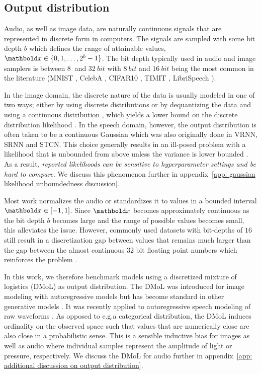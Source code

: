 {\subsection{Output distribution}
Audio, as well as image data, are naturally continuous signals that are represented in discrete form in computers. The signals are sampled with some bit depth $b$ which defines the range of attainable values, $\xb\in\{0,1,\dots,2^b-1\}$. The bit depth typically used in audio and image samplers is between $\SI{8}{}$ and $\SI{32}{bit}$ with $\SI{8}{bit}$ and $\SI{16}{bit}$ being the most common in the literature (MNIST \cite{lecun_gradientbased_1998}, CelebA \cite{liu_deep_2015}, CIFAR10 \cite{krizhevsky_learning_2009}, TIMIT \cite{garofolo_timit_1993}, LibriSpeech \cite{panayotov_librispeech_2015}).

In the image domain, the discrete nature of the data is usually modeled in one of two ways; either by using discrete distributions \cite{salimans_pixelcnn_2017, maaloe_biva_2019, child_very_2021} or by dequantizing the data and using a continuous distribution \cite{dinh_nice_2015, sonderby_ladder_2016, ho_flow_2019}, which yields a lower bound on the discrete distribution likelihood \cite{theis_note_2016}. 
In the speech domain, however, the output distribution is often taken to be a continuous Gaussian \cite{hsu_unsupervised_2017,lai_stochastic_2018,zhu_s3vae_2020} which was also originally done in VRNN, SRNN and STCN. 
This choice generally results in an ill-posed problem with a likelihood that is unbounded from above unless the variance is lower bounded \cite{mattei_leveraging_2018}. As a result, \emph{reported likelihoods can be sensitive to hyperparameter settings and be hard to compare}. We discuss this phenomenon further in appendix~\cref{app: gaussian likelihood unboundedness discussion}.

Most work normalizes the audio or standardizes it to values in a bounded interval $\xb\in[-1,1]$. Since $\xb$ becomes approximately continuous as the bit depth $b$ becomes large and the range of possible values becomes small, this alleviates the issue. However, commonly used datasets with bit-depths of $\SI{16}{}$ still result in a discretization gap between values that remains much larger than the gap between the almost continuous 32 bit floating point numbers which reinforces the problem \cite{bishop_pattern_2006}.

In this work, we therefore benchmark models using a discretized mixture of logistics (DMoL) as output distribution. The DMoL was introduced for image modeling with autoregressive models \cite{salimans_pixelcnn_2017} but has become standard in other generative models \cite{maaloe_biva_2019, vahdat_nvae_2020, child_very_2021}. 
It was recently applied to autoregressive speech modeling of raw waveforms \cite{oord_parallel_2018}. 
As opposed to e.g.\@ a categorical distribution, the DMoL induces ordinality on the observed space such that values that are numerically close are also close in a probabilistic sense. This is a sensible inductive bias for images as well as audio where individual samples represent the amplitude of light or pressure, respectively. We discuss the DMoL for audio further in appendix~\cref{app: additional discussion on output distribution}.


}
